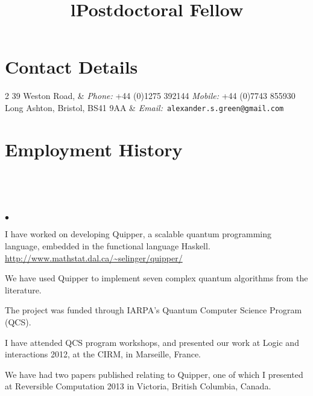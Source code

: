 \documentclass[line]{res}
\newenvironment{list2}{
  \begin{list}{$\bullet$}{%
      \setlength{\itemsep}{0in}
      \setlength{\parsep}{0.045in} \setlength{\parskip}{0in}
      \setlength{\topsep}{0in} \setlength{\partopsep}{0in}
      \setlength{\leftmargin}{0.2in}}}{\end{list}}
\begin{document}

\begin{resume}

\section{\sc Contact Details}
\begin{ncolumn}{2}
39 Weston Road, & {\it Phone:}  +44 (0)1275 392144 
   \hspace{3mm} {\it Mobile:}  +44 (0)7743 855930 \\
Long Ashton, Bristol, BS41 9AA & 
   {\it Email:}~\texttt{alexander.s.green@gmail.com} \\
\end{ncolumn}

\vspace{-4mm}
\section{\sc Employment History}
\begin{format}
\title{l}\\
\\
\body\\
\end{format}

\title{Postdoctoral Fellow}
\begin{position}
\vspace{-4mm}
\begin{list2}
\item I have worked on developing Quipper, a scalable quantum
  programming language, embedded in the functional language Haskell.
\url{http://www.mathstat.dal.ca/~selinger/quipper/}
\item We have used Quipper to implement seven complex quantum
  algorithms from the literature.
\item The project was funded through IARPA's Quantum Computer 
 Science Program (QCS).
\item I have attended QCS program workshops, and presented 
  our work at Logic and interactions 2012, at the CIRM, in 
  Marseille, France.
\item We have had two papers published relating to Quipper, one of
  which I presented at Reversible Computation 2013 in
  Victoria, British Columbia, Canada.
\end{list2}
\end{position}


\end{resume}
\end{document}
